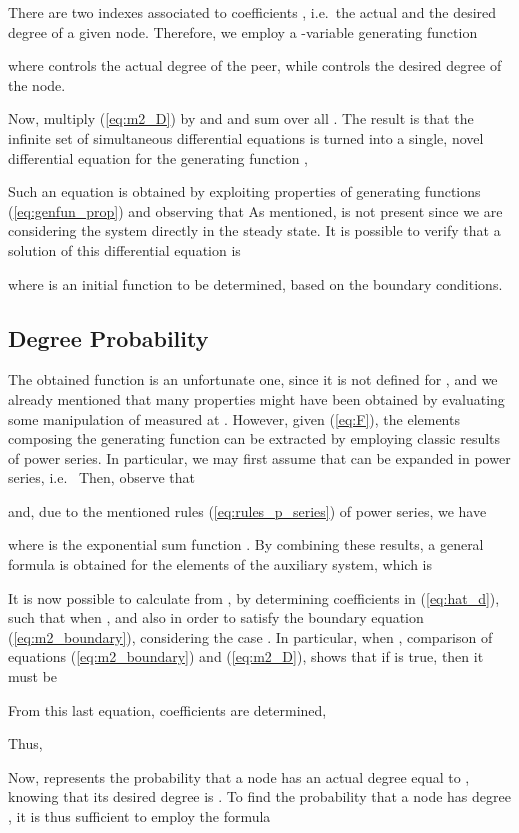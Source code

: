 \documentclass[a4paper,twosided]{article}
\begin{document}
There are two indexes associated to coefficients , i.e.~the actual and the desired degree of a given node. Therefore, we employ a -variable generating function 
 
where  controls the actual degree of the peer, while  controls the desired degree of the node. 

Now, multiply (\ref{eq:m2_D}) by  and  and sum over all . The result is that the infinite set of simultaneous differential equations is turned into a single, novel differential equation for the generating function ,

Such an equation is obtained by exploiting properties of generating functions (\ref{eq:genfun_prop}) and observing that 
As mentioned,  is not present since we are considering the system directly in the steady state. It is possible to verify that a solution of this differential equation is

where  is an initial function to be determined, based on the boundary conditions.

\subsection{Degree Probability}

The obtained function  is an unfortunate one, since it is not defined for , and we already mentioned that many properties might have been obtained by evaluating some manipulation of  measured at . However, given (\ref{eq:F}), the elements composing the generating function can be extracted by employing classic results of power series.
In particular, we may first assume that  can be expanded in power series, i.e.~
Then, observe that

and, due to the mentioned rules (\ref{eq:rules_p_series}) of power series, we have

where  is the exponential sum function .
By combining these results, a general formula is obtained for the elements of the auxiliary system, which is


It is now possible to calculate  from , by determining coefficients  in (\ref{eq:hat_d}), such that  when , and also in order to satisfy the boundary equation (\ref{eq:m2_boundary}), considering the case . In particular, when , comparison of equations (\ref{eq:m2_boundary}) and (\ref{eq:m2_D}), shows that if  is true, then it must be 

From this last equation, coefficients  are determined,

Thus,


Now,  represents the probability that a node has an actual degree equal to , knowing that its desired degree is . To find the probability  that a node has degree , it is thus sufficient to employ the formula
\end{document}

